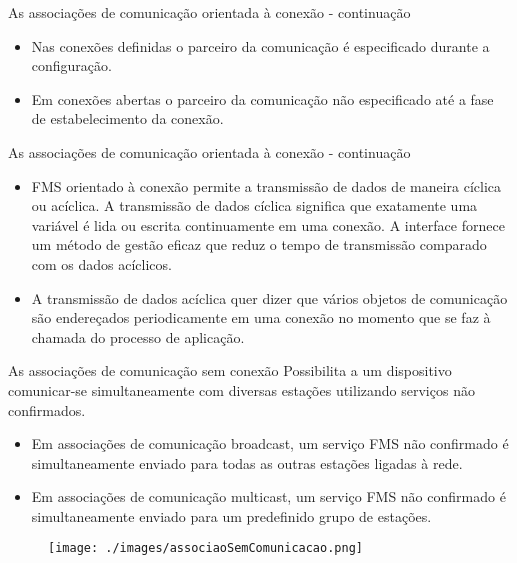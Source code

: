\documentclass{beamer}
\begin{document}
\begin{frame}{As associações de comunicação orientada à conexão - continuação}
\begin{itemize}
\item Nas conexões definidas o parceiro da comunicação é especificado durante a configuração. 

\item Em conexões abertas o parceiro da comunicação não especificado até a fase de estabelecimento da conexão.
\end{itemize}

\end{frame}

\begin{frame}{As associações de comunicação orientada à conexão - continuação}
\begin{itemize}
\item  FMS orientado à conexão permite a transmissão de dados de maneira cíclica ou acíclica. A transmissão de dados cíclica significa que exatamente uma variável é lida ou escrita continuamente em uma conexão. A interface fornece um método de gestão eficaz que reduz o tempo de transmissão comparado com os dados acíclicos. 
	
\item A transmissão de dados acíclica quer dizer que vários objetos de comunicação são endereçados periodicamente em uma conexão no momento que se faz à chamada do processo de aplicação.
\end{itemize}
\end{frame}

\begin{frame}{As associações de comunicação sem conexão}
Possibilita a um dispositivo comunicar-se simultaneamente com diversas estações utilizando serviços não confirmados.
\begin{itemize}
\item Em associações de comunicação broadcast, um serviço FMS não confirmado é simultaneamente enviado para todas as outras estações ligadas à rede.  
	
\item Em associações de comunicação multicast, um serviço FMS não confirmado é simultaneamente enviado para um predefinido grupo de estações.
\end{itemize}
\begin{figure}
\texttt{[image: ./images/associaoSemComunicacao.png]}
\end{figure}
\end{frame}
\end{document}
